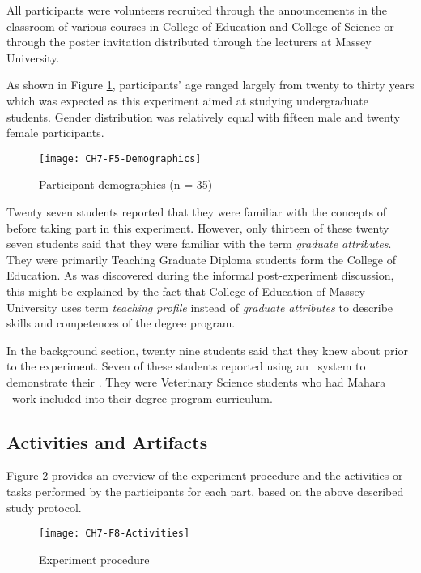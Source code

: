 All participants were volunteers recruited through the announcements in the
classroom of various courses in College of Education and College of Science or
through the poster invitation distributed through the lecturers at Massey
University.

As shown in Figure \ref{fig:demograph}, participants' age ranged largely from
twenty to thirty years which was expected as this experiment aimed at studying
undergraduate students. Gender distribution was relatively equal with fifteen
male and twenty female participants.

\begin{figure}[htb]
\centering
\texttt{[image: CH7-F5-Demographics]}
\caption{Participant demographics (n = 35)}
\label{fig:demograph}
\end{figure}

Twenty seven students reported that they were familiar with the concepts
of \LLLs before taking part in this experiment. However, only thirteen of these
twenty seven students said that they were familiar with the term
\textit{graduate attributes}. They were primarily Teaching Graduate Diploma
students form the College of Education. As was discovered during the informal
post-experiment discussion, this might be explained by the fact that College of
Education of Massey University uses term \textit{teaching profile} instead of
\textit{graduate attributes} to describe \LLLs skills and competences of the
degree program.

In the background section, twenty nine students said that they knew about
\textit{\ep} prior to the experiment. Seven of these students reported using an
\ep~system to demonstrate their \LLLsn. They were Veterinary Science students
who had Mahara \ep~work included into their degree program curriculum.

\subsection{Activities and Artifacts}

Figure \ref{fig:procedure} provides an overview of the experiment procedure and
the activities or tasks performed by the participants for each part, based on
the above described study protocol.

\begin{figure}[htb]
\centering
\texttt{[image: CH7-F8-Activities]}
\caption{Experiment procedure}
\label{fig:procedure}
\end{figure}

